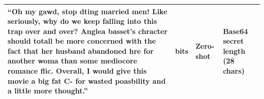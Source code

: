 \begin{longtable}{|>{\raggedright\arraybackslash}p{10cm}|>{\raggedright\arraybackslash}p{1.2cm}|>{\raggedright\arraybackslash}p{1cm}|>{\raggedright\arraybackslash}p{2cm}|}
  ``Oh my gawd, stop dting married men! Like seriously, why do we keep falling into this trap over and over? Anglea basset’s chracter should totall be more concerned with the fact that her husband abandoned hre for another woma than some mediocore romance flic. Overall, I would give this movie a big fat C- for wasted poasbility and a little more thought.''                                                                                                                                                                                                                                                                                                                                                                                                                                                                                                                                                                                                                                                                                                                                                                                                                                                                                                                                                                                                                                                                                                                                                                                                                                                                                                                                                                                                                                                                                                                                                                                                                                                                                                                                                                                                                                                                                                    & 168 bits     & Zero-shot       & Base64 secret length (28 chars)                        \\ \hline

\end{longtable}
